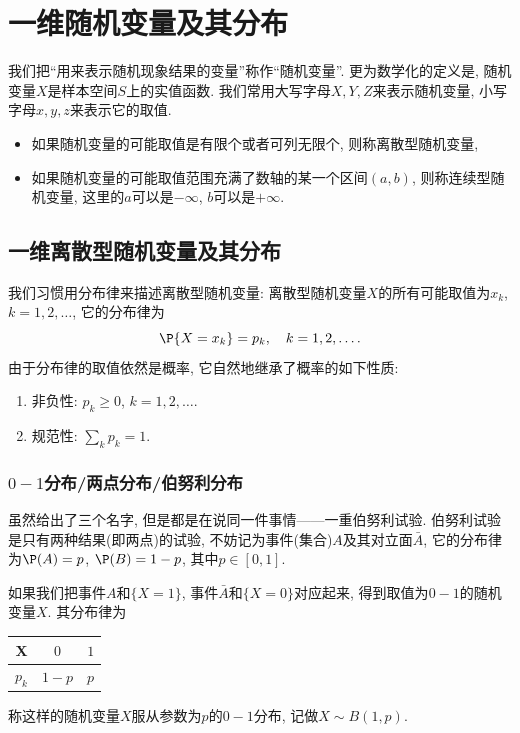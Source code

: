 \documentclass[11pt]{ctexart}
\begin{document}
\section{一维随机变量及其分布}

我们把“用来表示随机现象结果的变量”称作“随机变量”. 
更为数学化的定义是, 随机变量$X$是样本空间$S$上的实值函数. 
我们常用大写字母$X, Y, Z$来表示随机变量, 小写字母$x, y , z$来表示它的取值. 
\begin{itemize}
	\item 如果随机变量的可能取值是有限个或者可列无限个, 则称{\keben 离散型随机变量},
	\item 如果随机变量的可能取值范围充满了数轴的某一个区间$(a, b)$, 则称{\keben 连续型随机变量}, 这里的$a$可以是$- \infty$, $b$可以是$+ \infty$. 
\end{itemize}

\subsection{一维离散型随机变量及其分布}
 
我们习惯用{\keben 分布律}来描述离散型随机变量: 离散型随机变量$X$的所有可能取值为$x_k$, $k = 1, 2, \dots$, 它的分布律为
\begin{equation*}
	\P \{ X = x_k \} = p_k, \quad k =1,2,\dots. 
\end{equation*} 
由于分布律的取值依然是概率, 它自然地继承了概率的如下性质: 
\begin{enumerate}[label=(\arabic*)]
	\item {\keben 非负性:} $p_k \geq 0$, $k = 1, 2, \dots$. 
	\item {\keben 规范性:} $\sum_k p_k = 1$. 
\end{enumerate}

\subsubsection{$0-1$分布/两点分布/伯努利分布}

虽然给出了三个名字, 但是都是在说同一件事情——{\keben 一重伯努利试验}. 
伯努利试验是只有两种结果(即两点)的试验, 不妨记为事件(集合)$A$及其对立面$\bar A$, 它的分布律为$\P(A) = p$, $\P(B) = 1 - p$, 其中$p \in [0,1]$. 

如果我们把事件$A$和$\{X = 1\}$, 事件$\bar A$和$\{ X = 0\}$对应起来, 得到取值为$0-1$的随机变量$X$. 
其分布律为
\begin{table}[H]
	\centering
\begin{tabular}{c|c c}
	\toprule
		X & $0$ & $1$ \\
	\midrule
		$p_k$ & $1-p$ & $p$ \\
	\bottomrule
\end{tabular}
\end{table}
\noindent
称这样的随机变量$X$服从参数为$p$的$0-1$分布, 记做$X \sim B(1, p)$. 
\end{document}
